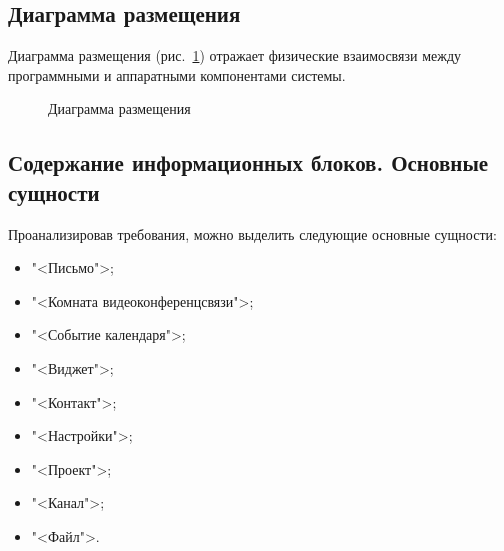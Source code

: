 \subsection{Диаграмма размещения}

Диаграмма размещения (рис.~\ref{place:image}) отражает физические взаимосвязи между программными и аппаратными компонентами системы.

\vspace{-8mm} %
\begin{figure}[H]
\caption{Диаграмма размещения}
\label{place:image}
\end{figure}

\subsection{Содержание информационных блоков. Основные сущности}

Проанализировав требования, можно выделить следующие основные сущности:
\begin{itemize}
  \item "<Письмо">;
  \item "<Комната видеоконференцсвязи">;
  \item "<Событие календаря">;
  \item "<Виджет">;
  \item "<Контакт">;
  \item "<Настройки">;
  \item "<Проект">;
  \item "<Канал">;
  \item "<Файл">.
\end{itemize}

